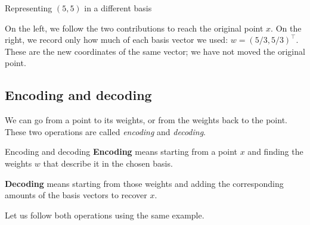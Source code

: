 \documentclass[a4paper,12pt,oneside]{report}
\begin{document}
\begin{framedexample}{Representing $(5,5)$ in a different basis}
\begin{center}
\end{center}
On the left, we follow the two contributions to reach the original
point $x$. On the right, we record only how much of each basis vector
we used: $w=(5/3,5/3)^\top$. These are the new coordinates of the
same vector; we have not moved the original point.
\end{framedexample}

\subsection{Encoding and decoding}

We can go from a point to its weights, or from the weights back to the
point. These two operations are called \emph{encoding} and
\emph{decoding}.

\begin{frameddefn}{Encoding and decoding}
\textbf{Encoding} means starting from a point $x$ and finding the
weights $w$ that describe it in the chosen basis.

\textbf{Decoding} means starting from those weights and adding the
corresponding amounts of the basis vectors to recover $x$.
\end{frameddefn}

Let us follow both operations using the same example.
\end{document}

